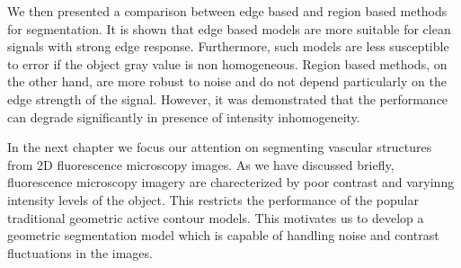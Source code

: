 We then presented a comparison between edge based and region based methods for segmentation. It is shown that edge based models are more suitable for clean signals with strong edge response. Furthermore, such models are less susceptible to error if the object gray value is non homogeneous. Region based methods, on the other hand, are more robust to noise and do not depend particularly on the edge strength of the signal. However, it was demonstrated that the performance can degrade significantly in presence of intensity inhomogeneity. 

In the next chapter we focus our attention on segmenting vascular structures from 2D fluorescence microscopy images. As we have discussed briefly, fluorescence microscopy imagery are charecterized by poor contrast and varyinng intensity levels of the object.  This restricts the performance of the popular traditional geometric active contour models. This motivates us to develop a geometric segmentation model which is capable of handling noise and contrast fluctuations in the images.

